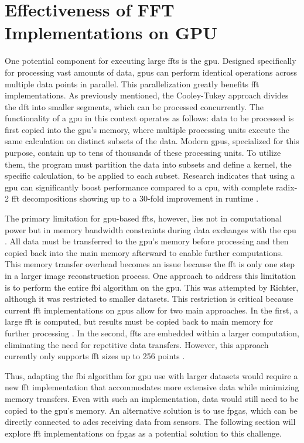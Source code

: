\section{Effectiveness of FFT Implementations on GPU}
One potential component for executing large \ac{fft}s is the \ac{gpu}. Designed specifically for processing vast amounts of data, \ac{gpu}s can perform identical operations across multiple data points in parallel. This parallelization greatly benefits \ac{fft} implementations. As previously mentioned, the Cooley-Tukey approach divides the \ac{dft} into smaller segments, which can be processed concurrently. The functionality of a \ac{gpu} in this context operates as follows: data to be processed is first copied into the \ac{gpu}’s memory, where multiple processing units execute the same calculation on distinct subsets of the data. Modern \ac{gpu}s, specialized for this purpose, contain up to tens of thousands of these processing units. To utilize them, the program must partition the data into subsets and define a kernel, the specific calculation, to be applied to each subset. Research indicates that using a \ac{gpu} can significantly boost performance compared to a \ac{cpu}, with complete radix-2 \ac{fft} decompositions showing up to a 30-fold improvement in runtime \cite{puchala_effectiveness_2015}.\par
The primary limitation for \ac{gpu}-based \ac{fft}s, however, lies not in computational power but in memory bandwidth constraints during data exchanges with the \ac{cpu} \cite{lloyd_fast_2008}. All data must be transferred to the \ac{gpu}’s memory before processing and then copied back into the main memory afterward to enable further computations. This memory transfer overhead becomes an issue because the \ac{fft} is only one step in a larger image reconstruction process. One approach to address this limitation is to perform the entire \ac{fbi} algorithm on the \ac{gpu}. This was attempted by Richter, although it was restricted to smaller datasets. This restriction is critical because current \ac{fft} implementations on \ac{gpu}s allow for two main approaches. In the first, a large \ac{fft} is computed, but results must be copied back to main memory for further processing \cite{cufft}. In the second, \ac{fft}s are embedded within a larger computation, eliminating the need for repetitive data transfers. However, this approach currently only supports \ac{fft} sizes up to 256 points \cite{cufftdx}.\par
Thus, adapting the \ac{fbi} algorithm for \ac{gpu} use with larger datasets would require a new \ac{fft} implementation that accommodates more extensive data while minimizing memory transfers. Even with such an implementation, data would still need to be copied to the \ac{gpu}’s memory. An alternative solution is to use \ac{fpga}s, which can be directly connected to \ac{adc}s receiving data from sensors. The following section will explore \ac{fft} implementations on \ac{fpga}s as a potential solution to this challenge.

